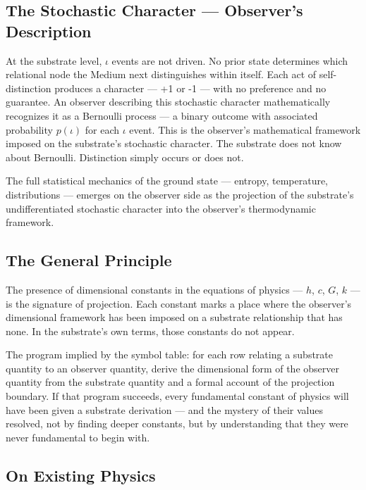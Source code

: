 \documentclass[11pt,letterpaper]{article}
\begin{document}
\subsection{The Stochastic Character --- Observer's Description}
\label{sec:orgc2ad5a3}

At the substrate level, \(\iota\) events are not driven. No prior state determines which relational node the Medium next distinguishes within itself. Each act of self-distinction produces a character --- +1 or -1 --- with no preference and no guarantee. An observer describing this stochastic character mathematically recognizes it as a Bernoulli process --- a binary outcome with associated probability \(p(\iota)\) for each \(\iota\) event. This is the observer's mathematical framework imposed on the substrate's stochastic character. The substrate does not know about Bernoulli. Distinction simply occurs or does not.

The full statistical mechanics of the ground state --- entropy, temperature, distributions --- emerges on the observer side as the projection of the substrate's undifferentiated stochastic character into the observer's thermodynamic framework.

\subsection{The General Principle}
\label{sec:org5880f36}

The presence of dimensional constants in the equations of physics --- \(h\), \(c\), \(G\), \(k\) --- is the signature of projection. Each constant marks a place where the observer's dimensional framework has been imposed on a substrate relationship that has none. In the substrate's own terms, those constants do not appear.

The program implied by the symbol table: for each row relating a substrate quantity to an observer quantity, derive the dimensional form of the observer quantity from the substrate quantity and a formal account of the projection boundary. If that program succeeds, every fundamental constant of physics will have been given a substrate derivation --- and the mystery of their values resolved, not by finding deeper constants, but by understanding that they were never fundamental to begin with.

\subsection{On Existing Physics}
\label{sec:org5d3160c}
\end{document}
